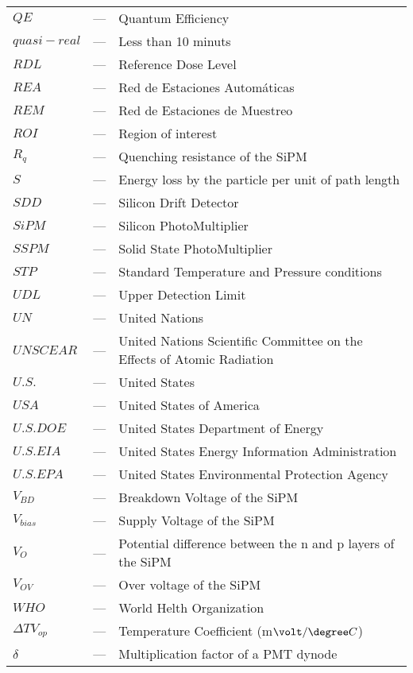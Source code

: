 \begin{longtable}{p{25mm} c p{120mm} }
$QE$ & --- & Quantum Efficiency\\
$quasi-real$ & --- & Less than 10 minuts\\
$RDL$ & --- & Reference Dose Level\\
$REA$ & --- & Red de Estaciones Automáticas\\
$REM$ & --- & Red de Estaciones de Muestreo\\
$ROI$ & --- & Region of interest\\
$R_q$ & --- & Quenching resistance of the SiPM\\
$S$ & --- & Energy loss by the particle per unit of path length\\
$SDD$ & --- & Silicon Drift Detector\\
$SiPM$ & --- & Silicon PhotoMultiplier\\
$SSPM$ & --- & Solid State PhotoMultiplier\\
$STP$ & --- & Standard Temperature and Pressure conditions\\
$UDL$ & --- & Upper Detection Limit\\
$UN$ & --- & United Nations\\
$UNSCEAR$ & --- & United Nations Scientific Committee on the Effects
\newline
of Atomic Radiation\\
$U.S.$ & --- & United States\\
$USA$ & --- & United States of America\\
$U.S. DOE$ & --- & United States Department of Energy\\
$U.S. EIA$ & --- & United States Energy Information Administration\\
$U.S. EPA$ & --- & United States Environmental Protection Agency\\
$V_{BD}$ & --- & Breakdown Voltage of the SiPM\\
$V_{bias}$ & --- & Supply Voltage of the SiPM\\
$V_{O}$ & --- & Potential difference between the n and p layers of 
\newline
the SiPM\\
$V_{OV}$ & --- & Over voltage of the SiPM\\
$WHO$ & --- & World Helth Organization\\
$\Delta TV_{op}$ & --- & Temperature Coefficient (m$\volt/\degree C$)\\
$\delta$ & --- & Multiplication factor of a PMT dynode\\


\end{longtable}
